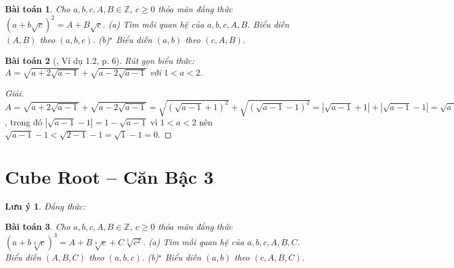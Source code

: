 \documentclass{article}
\newtheorem{baitoan}{Bài toán}
\newtheorem{luuy}{Lưu ý}
\begin{document}
\begin{baitoan}
	Cho $a,b,c,A,B\in\mathbb{Z}$, $c\ge0$ thỏa mãn đẳng thức $(a + b\sqrt{c})^2 = A + B\sqrt{c}$. (a) Tìm mối quan hệ của $a,b,c,A,B$. Biểu diễn $(A,B)$ theo $(a,b,c)$. (b)${}^\star$ Biểu diễn $(a,b)$ theo $(c,A,B)$.
\end{baitoan}

\begin{baitoan}[\cite{TLCT_THCS_Toan_9_dai_so}, Ví dụ 1.2, p. 6]
	Rút gọn biểu thức: $A = \sqrt{a + 2\sqrt{a - 1}} + \sqrt{a - 2\sqrt{a - 1}}$ với $1 < a < 2$.
\end{baitoan}

\begin{proof}[Giải]
	$A = \sqrt{a + 2\sqrt{a - 1}} + \sqrt{a - 2\sqrt{a - 1}} = \sqrt{(\sqrt{a - 1} + 1)^2} + \sqrt{(\sqrt{a - 1} - 1)^2} = |\sqrt{a - 1} + 1| + |\sqrt{a - 1} - 1| = \sqrt{a - 1} + 1 + + 1 - \sqrt{a - 1} = 2$, trong đó $|\sqrt{a - 1} - 1| = 1 - \sqrt{a - 1}$ vì $1 < a < 2$ nên $\sqrt{a - 1} - 1 < \sqrt{2 - 1} - 1 = \sqrt{1} - 1 = 0$.
\end{proof}



\section{Cube Root -- Căn Bậc 3}

\begin{luuy}
	Đẳng thức: 
\end{luuy}

\begin{baitoan}
	Cho $a,b,c,A,B\in\mathbb{Z}$, $c\ge0$ thỏa mãn đẳng thức $(a + b\sqrt[3]{c})^3 = A + B\sqrt[3]{c} + C\sqrt[3]{c^2}$. (a) Tìm mối quan hệ của $a,b,c,A,B,C$. Biểu diễn $(A,B,C)$ theo $(a,b,c)$. (b)${}^\star$ Biểu diễn $(a,b)$ theo $(c,A,B,C)$.
\end{baitoan}


\printbibliography[heading=bibintoc]
	
\end{document}
